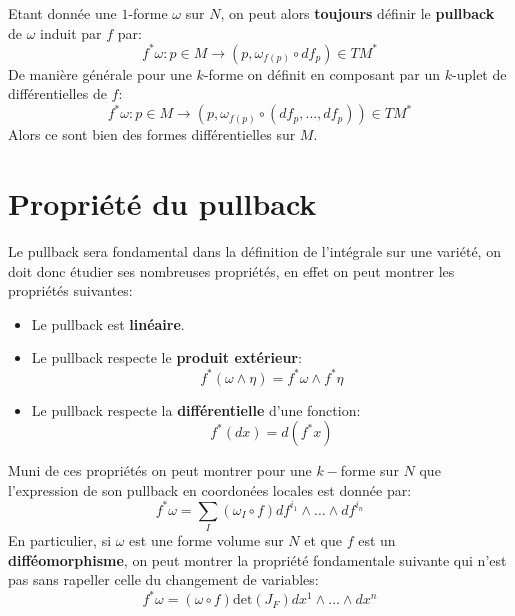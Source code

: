    Etant donnée une \( 1 \)-forme \( \omega \) sur \( N \), on peut alors \textbf{toujours} définir le \textbf{pullback} de \( \omega \) induit par \( f \) par:
   \[ 
      f^*\omega : p \in M \longrightarrow (p, \omega_{f(p)} \circ df_p) \in TM^*
   \]   
   De manière générale pour une \( k \)-forme on définit en composant par un \( k \)-uplet de différentielles de \( f \):
   \[ 
      f^*\omega : p \in M \longrightarrow (p, \omega_{f(p)} \circ (df_p, \ldots, df_p)) \in TM^*
   \]
   Alors ce sont bien des formes différentielles sur \( M \). 
   
   \section{Propriété du pullback}
      Le pullback sera fondamental dans la définition de l'intégrale sur une variété, on doit donc étudier ses nombreuses propriétés, en effet on peut montrer les propriétés suivantes:
      \begin{itemize}
         \item Le pullback est \textbf{linéaire}.
         \item Le pullback respecte le \textbf{produit extérieur}:
         \[ 
            f^*(\omega \wedge \eta) = f^*\omega \wedge f^*\eta
         \]
         \item Le pullback respecte la \textbf{différentielle} d'une fonction:
         \[ 
            f^*(dx) = d(f^*x)
         \]
      \end{itemize}
      Muni de ces propriétés on peut montrer pour une \( k-\)forme sur \( N \) que l'expression de son pullback en coordonées locales est donnée par:
      \[ 
         f^*\omega = \sum_I (\omega_I \circ f) df^{i_1} \wedge \ldots \wedge df^{i_n}
      \]
      En particulier, si \( \omega \) est une forme volume sur \( N \) et que \( f \) est un \textbf{difféomorphisme}, on peut montrer la propriété fondamentale suivante qui n'est pas sans rapeller celle du changement de variables:
      \[ 
         f^*\omega = (\omega \circ f) \text{det}(J_F) dx^{1} \wedge \ldots \wedge dx^{n}
      \]
